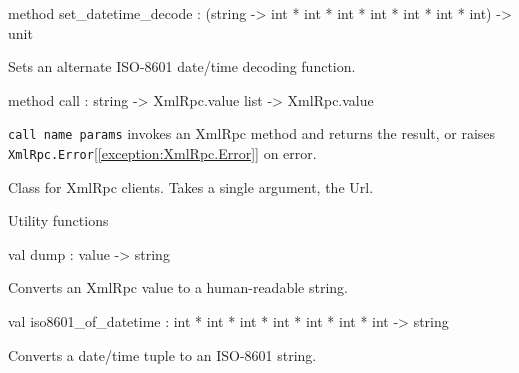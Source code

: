 \documentclass[11pt]{article}
\begin{document}
\begin{ocamldocobjectend}
\begin{ocamldocdescription}
\end{ocamldocdescription}


\label{method:XmlRpc.client.set-underscoredatetime-underscoredecode}\begin{ocamldoccode}
method set_datetime_decode :
  (string -> int * int * int * int * int * int * int) -> unit
\end{ocamldoccode}
\begin{ocamldocdescription}
Sets an alternate ISO-8601 date/time decoding function.


\end{ocamldocdescription}


\label{method:XmlRpc.client.call}\begin{ocamldoccode}
method call : string -> XmlRpc.value list -> XmlRpc.value
\end{ocamldoccode}
\begin{ocamldocdescription}
{\tt{call name params}} invokes an XmlRpc method and returns the result,
      or raises {\tt{XmlRpc.Error}}[\ref{exception:XmlRpc.Error}] on error.


\end{ocamldocdescription}
\end{ocamldocobjectend}


\begin{ocamldocdescription}
Class for XmlRpc clients. Takes a single argument, the Url.


\end{ocamldocdescription}




Utility functions



\label{val:XmlRpc.dump}\begin{ocamldoccode}
val dump : value -> string
\end{ocamldoccode}
\begin{ocamldocdescription}
Converts an XmlRpc value to a human-readable string.


\end{ocamldocdescription}




\label{val:XmlRpc.iso8601-underscoreof-underscoredatetime}\begin{ocamldoccode}
val iso8601_of_datetime : int * int * int * int * int * int * int -> string
\end{ocamldoccode}
\begin{ocamldocdescription}
Converts a date/time tuple to an ISO-8601 string.


\end{ocamldocdescription}
\end{document}
